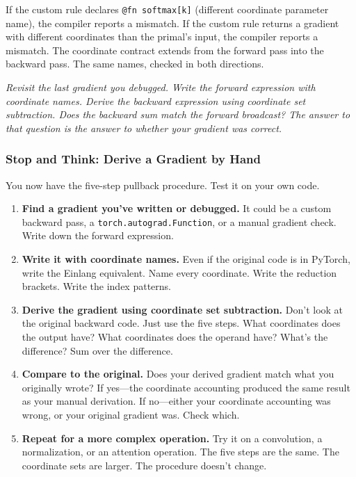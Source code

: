 \documentclass[11pt,titlepage]{article}
\begin{document}
If the custom rule declares \texttt{@fn\ softmax{[}k{]}} (different
coordinate parameter name), the compiler reports a mismatch. If the
custom rule returns a gradient with different coordinates than the
primal's input, the compiler reports a mismatch. The coordinate contract
extends from the forward pass into the backward pass. The same names,
checked in both directions.

\vspace{2em}

\emph{Revisit the last gradient you debugged. Write the forward
expression with coordinate names. Derive the backward expression using
coordinate set subtraction. Does the backward sum match the forward
broadcast? The answer to that question is the answer to whether your
gradient was correct.}

\vspace{2em}

\hypertarget{stop-and-think-derive-a-gradient-by-hand}{%
\subsubsection{Stop and Think: Derive a Gradient by
Hand}\label{stop-and-think-derive-a-gradient-by-hand}}

You now have the five-step pullback procedure. Test it on your own code.

\begin{enumerate}
\def\labelenumi{\arabic{enumi}.}
\item
  \textbf{Find a gradient you've written or debugged.} It could be a
  custom backward pass, a \texttt{torch.autograd.Function}, or a manual
  gradient check. Write down the forward expression.
\item
  \textbf{Write it with coordinate names.} Even if the original code is
  in PyTorch, write the Einlang equivalent. Name every coordinate. Write
  the reduction brackets. Write the index patterns.
\item
  \textbf{Derive the gradient using coordinate set subtraction.} Don't
  look at the original backward code. Just use the five steps. What
  coordinates does the output have? What coordinates does the operand
  have? What's the difference? Sum over the difference.
\item
  \textbf{Compare to the original.} Does your derived gradient match
  what you originally wrote? If yes---the coordinate accounting produced
  the same result as your manual derivation. If no---either your
  coordinate accounting was wrong, or your original gradient was. Check
  which.
\item
  \textbf{Repeat for a more complex operation.} Try it on a convolution,
  a normalization, or an attention operation. The five steps are the
  same. The coordinate sets are larger. The procedure doesn't change.
\end{enumerate}
\end{document}
